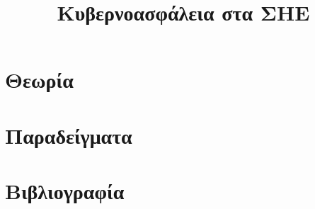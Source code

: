 \title{Κυβερνοασφάλεια στα ΣΗΕ}

\section{Θεωρία}
\label{kef-08-theoria}

\section{Παραδείγματα}
\label{kef-08-paradeigmata}

\section{Βιβλιογραφία}
\label{kef-08-vivliografia}
